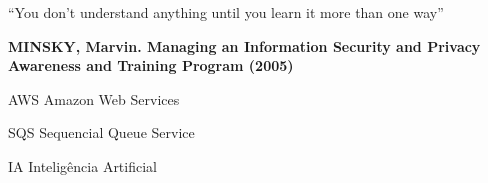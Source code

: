 \documentclass[12pt,oneside,a4paper,chapter=TITLE, english, french,	spanish, brazil]{abntex2-logatti}
\begin{document}
\begin{epigrafe}
“You don't understand anything until you learn it more than one way”

\textbf{MINSKY, Marvin. Managing an Information Security and Privacy Awareness and Training
Program (2005)}
\end{epigrafe}



\setlength{\absparsep}{18pt} %







\listoffigures*
\cleardoublepage






\begin{siglas}
  \item[AWS] Amazon Web Services
  \item[SQS] Sequencial Queue Service
  \item[IA] Inteligência Artificial
\end{siglas}
\end{document}
